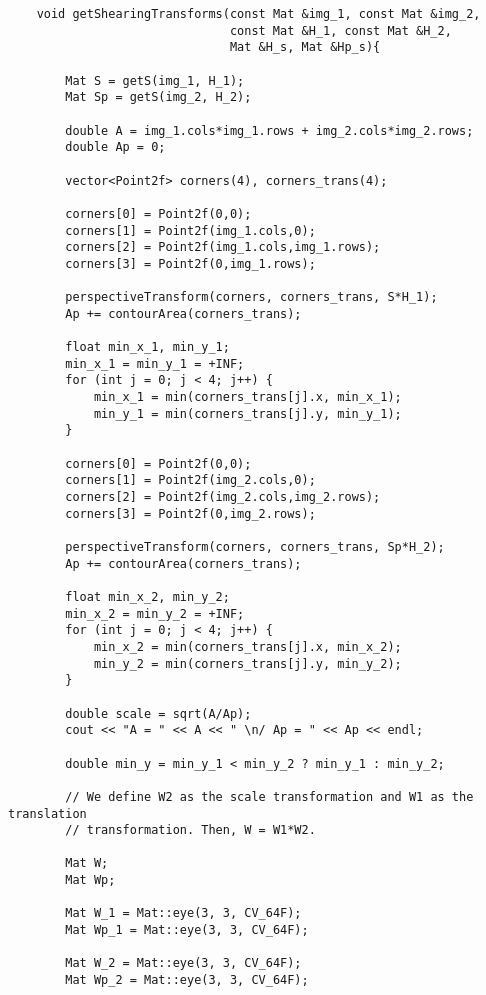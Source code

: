 \documentclass[a4paper, 11pt]{article}
\theoremstyle{definition}
\begin{document}
    \begin{lstlisting}
    void getShearingTransforms(const Mat &img_1, const Mat &img_2,
                               const Mat &H_1, const Mat &H_2,
                               Mat &H_s, Mat &Hp_s){

        Mat S = getS(img_1, H_1);
        Mat Sp = getS(img_2, H_2);

        double A = img_1.cols*img_1.rows + img_2.cols*img_2.rows;
        double Ap = 0;

        vector<Point2f> corners(4), corners_trans(4);

        corners[0] = Point2f(0,0);
        corners[1] = Point2f(img_1.cols,0);
        corners[2] = Point2f(img_1.cols,img_1.rows);
        corners[3] = Point2f(0,img_1.rows);

        perspectiveTransform(corners, corners_trans, S*H_1);
        Ap += contourArea(corners_trans);

        float min_x_1, min_y_1;
        min_x_1 = min_y_1 = +INF;
        for (int j = 0; j < 4; j++) {
            min_x_1 = min(corners_trans[j].x, min_x_1);
            min_y_1 = min(corners_trans[j].y, min_y_1);
        }

        corners[0] = Point2f(0,0);
        corners[1] = Point2f(img_2.cols,0);
        corners[2] = Point2f(img_2.cols,img_2.rows);
        corners[3] = Point2f(0,img_2.rows);

        perspectiveTransform(corners, corners_trans, Sp*H_2);
        Ap += contourArea(corners_trans);

        float min_x_2, min_y_2;
        min_x_2 = min_y_2 = +INF;
        for (int j = 0; j < 4; j++) {
            min_x_2 = min(corners_trans[j].x, min_x_2);
            min_y_2 = min(corners_trans[j].y, min_y_2);
        }

        double scale = sqrt(A/Ap);
        cout << "A = " << A << " \n/ Ap = " << Ap << endl;

        double min_y = min_y_1 < min_y_2 ? min_y_1 : min_y_2;

        // We define W2 as the scale transformation and W1 as the translation
        // transformation. Then, W = W1*W2.

        Mat W;
        Mat Wp;

        Mat W_1 = Mat::eye(3, 3, CV_64F);
        Mat Wp_1 = Mat::eye(3, 3, CV_64F);

        Mat W_2 = Mat::eye(3, 3, CV_64F);
        Mat Wp_2 = Mat::eye(3, 3, CV_64F);


\end{lstlisting}
\end{document}
